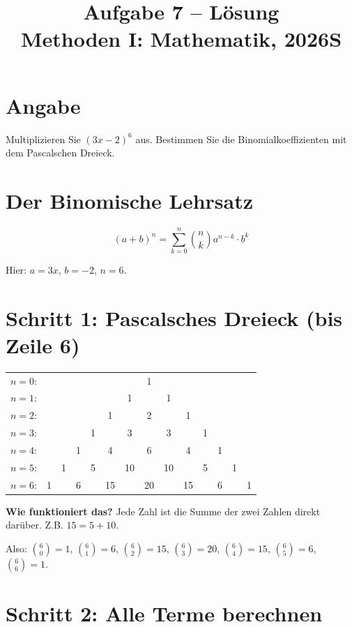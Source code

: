 \documentclass[12pt, a4paper]{article}
\title{\textbf{Aufgabe 7 -- Lösung} \\ Methoden I: Mathematik, 2026S}
\author{}
\date{}
\begin{document}
\maketitle

\section*{Angabe}
Multiplizieren Sie $(3x - 2)^6$ aus. Bestimmen Sie die Binomialkoeffizienten mit dem Pascalschen Dreieck.

\section*{Der Binomische Lehrsatz}

\[
    (a + b)^n = \sum_{k=0}^{n} \binom{n}{k} a^{n-k} \cdot b^k
\]

Hier: $a = 3x$, $b = -2$, $n = 6$.

\section*{Schritt 1: Pascalsches Dreieck (bis Zeile 6)}

\begin{center}
\begin{tabular}{rccccccccccccc}
    $n=0$: & & & & & & & 1 \\
    $n=1$: & & & & & & 1 & & 1 \\
    $n=2$: & & & & & 1 & & 2 & & 1 \\
    $n=3$: & & & & 1 & & 3 & & 3 & & 1 \\
    $n=4$: & & & 1 & & 4 & & 6 & & 4 & & 1 \\
    $n=5$: & & 1 & & 5 & & 10 & & 10 & & 5 & & 1 \\
    $n=6$: & 1 & & 6 & & 15 & & 20 & & 15 & & 6 & & 1
\end{tabular}
\end{center}

\textbf{Wie funktioniert das?} Jede Zahl ist die Summe der zwei Zahlen direkt darüber. Z.B. $15 = 5 + 10$.

Also: $\binom{6}{0} = 1$, $\binom{6}{1} = 6$, $\binom{6}{2} = 15$, $\binom{6}{3} = 20$, $\binom{6}{4} = 15$, $\binom{6}{5} = 6$, $\binom{6}{6} = 1$.

\section*{Schritt 2: Alle Terme berechnen}
\end{document}
